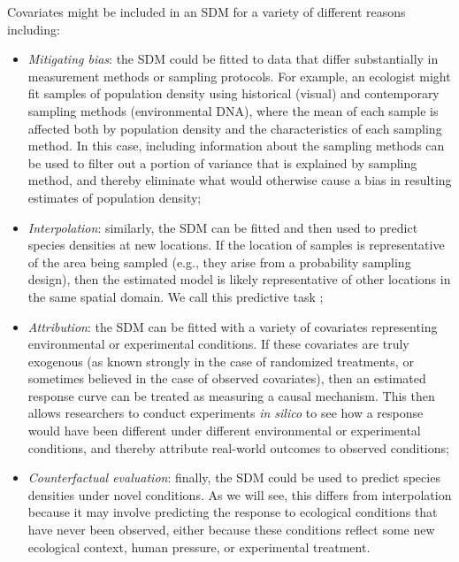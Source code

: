 Covariates might be included in an SDM for a variety of different reasons including: 
\begin{itemize}
    \item \textit{Mitigating bias}: the SDM could be fitted to data that differ substantially in measurement methods or sampling protocols.  For example, an ecologist might fit samples of population density using historical (visual) and contemporary sampling methods (environmental DNA), where the mean of each sample is affected both by population density and the characteristics of each sampling method.  In this case, including information about the sampling methods can be used to filter out a portion of variance that is explained by sampling method, and thereby eliminate what would otherwise cause a bias in resulting estimates of population density;
 
    \item \textit{Interpolation}: similarly, the SDM can be fitted and then used to predict species densities at new locations.  If the location of samples is representative of the area being sampled (e.g., they arise from a probability sampling design), then the estimated model is likely representative of other locations in the same spatial domain.  We call this predictive task ;
    
    \item \textit{Attribution}: the SDM can be fitted with a variety of covariates representing environmental or experimental conditions.  If these covariates are truly exogenous (as known strongly in the case of randomized treatments, or sometimes believed in the case of observed covariates), then an estimated response curve can be treated as measuring a causal mechanism.  This then allows researchers to conduct experiments \textit{in silico} to see how a response would have been different under different environmental or experimental conditions, and thereby attribute real-world outcomes to observed conditions;

   \item \textit{Counterfactual evaluation}:  finally, the SDM could be used to predict species densities under novel conditions.  As we will see, this differs from interpolation because it may involve predicting the response to ecological conditions that have never been observed, either because these conditions reflect some new ecological context, human pressure, or experimental treatment.  
\end{itemize}
